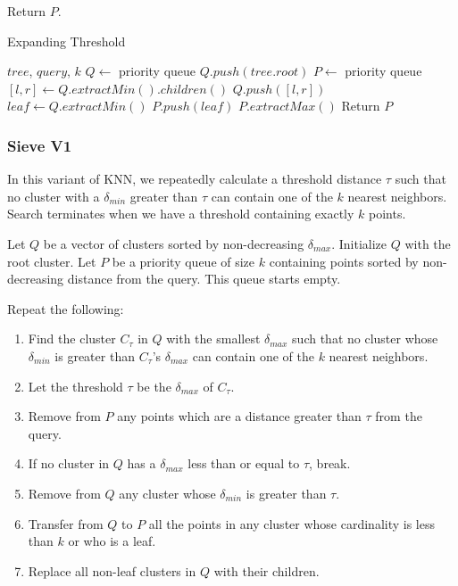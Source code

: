 Return $P$. 


\begin{algorithm} %
\caption{Expanding Threshold} %
\label{alg:expanding_threshold} %
\begin{algorithmic}[1] %
    \REQUIRE $tree$, $query$, $k$
    \STATE $Q \leftarrow$ priority queue
    \STATE $Q.push(tree.root)$
    \STATE $P \leftarrow$ priority queue
            \STATE $[l, r] \leftarrow Q.extractMin().children()$
            \STATE $Q.push([l, r])$
        \ENDWHILE
        \STATE $leaf \leftarrow Q.extractMin()$
        \STATE $P.push(leaf)$
            \STATE $P.extractMax()$
        \ENDWHILE
    \ENDWHILE
    \STATE Return $P$
\end{algorithmic}
\end{algorithm}


\subsubsection{Sieve V1}
\label{subsubsec:methods:knn-search:sieve-v1}

In this variant of KNN, we repeatedly calculate a threshold distance $\tau$ such that no cluster with a $\delta_{min}$ greater than $\tau$ 
can contain one of the $k$ nearest neighbors. Search terminates when we have a threshold containing exactly $k$ points.

Let $Q$ be a vector of clusters sorted by non-decreasing $\delta_{max}$. Initialize $Q$ with  
the root cluster. 
Let $P$ be a priority queue of size $k$ containing points sorted by non-decreasing distance from the query. This queue starts empty.


Repeat the following: 
\begin{enumerate}
\item Find the cluster $C_{\tau}$ in $Q$ with the smallest $\delta_{max}$ such that no cluster whose $\delta_{min}$ is greater than $C_{\tau}$'s $\delta_{max}$ can contain one of the $k$ nearest neighbors.
\item Let the threshold $\tau$ be the $\delta_{max}$ of $C_{\tau}$.
\item Remove from $P$ any points which are a distance greater than $\tau$ from the query. 
\item If no cluster in $Q$ has a $\delta_{max}$ less than or equal to $\tau$, break.
\item Remove from $Q$ any cluster whose $\delta_{min}$ is greater than $\tau$.
\item Transfer from $Q$ to $P$ all the points in any cluster whose cardinality is less than $k$ or who is a leaf. 
\item Replace all non-leaf clusters in $Q$ with their children. 
\end{enumerate}

